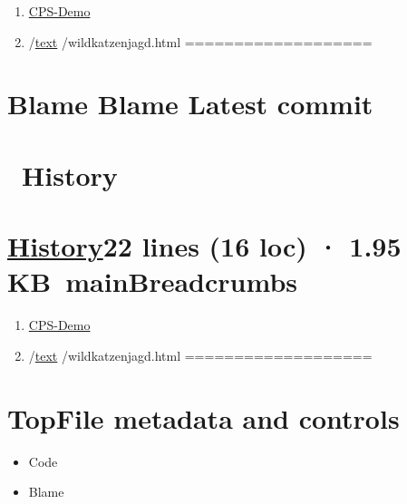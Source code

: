 \documentclass[
  letterpaper,
]{book}
\providecommand{\tightlist}{%
  \setlength{\itemsep}{0pt}\setlength{\parskip}{0pt}}\usepackage{longtable,booktabs,array}
\begin{document}
\begin{enumerate}
\def\labelenumi{\arabic{enumi}.}
\tightlist
\item
  \href{./shionkim/CPS-Demo/tree/main}{CPS-Demo}
\item
  /\href{./shionkim/CPS-Demo/tree/main/text}{text} /wildkatzenjagd.html
  ===================
\end{enumerate}

\section{Blame Blame Latest commit}\label{blame-blame-latest-commit}

\section{~History}\label{history}

\section{\texorpdfstring{\href{./shionkim/CPS-Demo/commits/main/text/wildkatzenjagd.html}{History}22
lines (16 loc) · 1.95
KB~mainBreadcrumbs}{History22 lines (16 loc) · 1.95 KB~mainBreadcrumbs}}\label{history22-lines-16-loc-1.95-kb-mainbreadcrumbs}

\begin{enumerate}
\def\labelenumi{\arabic{enumi}.}
\tightlist
\item
  \href{./shionkim/CPS-Demo/tree/main}{CPS-Demo}
\item
  /\href{./shionkim/CPS-Demo/tree/main/text}{text} /wildkatzenjagd.html
  ===================
\end{enumerate}

\section{TopFile metadata and
controls}\label{topfile-metadata-and-controls}

\begin{itemize}
\tightlist
\item
  Code
\item
  Blame
\end{itemize}
\end{document}
